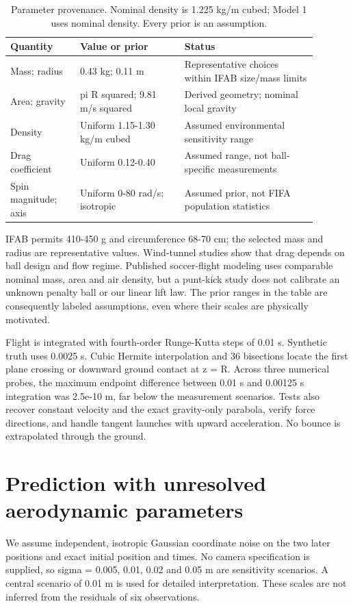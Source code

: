 \documentclass[11pt,a4paper]{article}
\begin{document}
\begin{table}[htbp]\centering\small
\setlength{\tabcolsep}{3pt}
\begin{tabular}{p{0.205\linewidth}p{0.303\linewidth}p{0.383\linewidth}}\toprule
Quantity & Value or prior & Status\\\midrule
Mass; radius & 0.43 kg; 0.11 m & Representative choices within IFAB size/mass limits\\
Area; gravity & pi R squared; 9.81 m/s squared & Derived geometry; nominal local gravity\\
Density & Uniform 1.15-1.30 kg/m cubed & Assumed environmental sensitivity range\\
Drag coefficient & Uniform 0.12-0.40 & Assumed range, not ball-specific measurements\\
Spin magnitude; axis & Uniform 0-80 rad/s; isotropic & Assumed prior, not FIFA population statistics\\
\bottomrule\end{tabular}
\caption{Parameter provenance. Nominal density is 1.225 kg/m cubed; Model 1 uses nominal density. Every prior is an assumption.}
\end{table}
IFAB permits 410-450 g and circumference 68-70 cm; the selected mass and radius are representative values.\cite{ifab} Wind-tunnel studies show that drag depends on ball design and flow regime.\cite{asai2013} Published soccer-flight modeling uses comparable nominal mass, area and air density, but a punt-kick study does not calibrate an unknown penalty ball or our linear lift law.\cite{linthorne2011} The prior ranges in the table are consequently labeled assumptions, even where their scales are physically motivated.

Flight is integrated with fourth-order Runge-Kutta steps of 0.01 s. Synthetic truth uses 0.0025 s. Cubic Hermite interpolation and 36 bisections locate the first plane crossing or downward ground contact at z = R. Across three numerical probes, the maximum endpoint difference between 0.01 s and 0.00125 s integration was 2.5e-10 m, far below the measurement scenarios. Tests also recover constant velocity and the exact gravity-only parabola, verify force directions, and handle tangent launches with upward acceleration. No bounce is extrapolated through the ground.

\section{Prediction with unresolved aerodynamic parameters}
We assume independent, isotropic Gaussian coordinate noise on the two later positions and exact initial position and times. No camera specification is supplied, so sigma = 0.005, 0.01, 0.02 and 0.05 m are sensitivity scenarios. A central scenario of 0.01 m is used for detailed interpretation. These scales are not inferred from the residuals of six observations.
\end{document}
